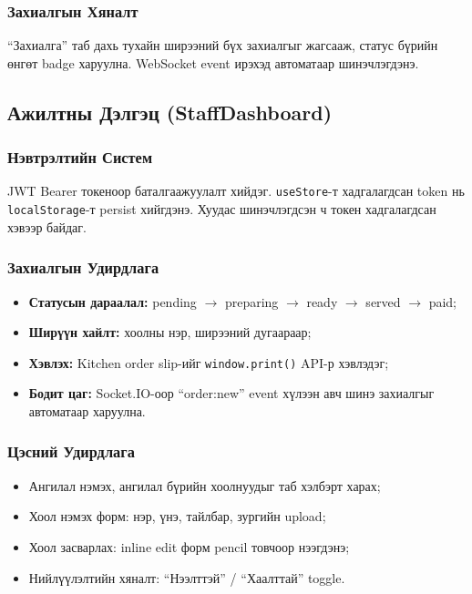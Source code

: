 \documentclass[12pt,a4paper]{article}
\begin{document}
\subsubsection{Захиалгын Хяналт}
``Захиалга'' таб дахь тухайн ширээний бүх захиалгыг жагсааж,
статус бүрийн өнгөт badge харуулна. WebSocket event ирэхэд
автоматаар шинэчлэгдэнэ.

\subsection{Ажилтны Дэлгэц (StaffDashboard)}

\subsubsection{Нэвтрэлтийн Систем}
JWT Bearer токеноор баталгаажуулалт хийдэг. \texttt{useStore}-т
хадгалагдсан token нь \texttt{localStorage}-т persist хийгдэнэ.
Хуудас шинэчлэгдсэн ч токен хадгалагдсан хэвээр байдаг.

\subsubsection{Захиалгын Удирдлага}
\begin{itemize}
  \item \textbf{Статусын дараалал:}
        pending $\to$ preparing $\to$ ready $\to$ served $\to$ paid;
  \item \textbf{Ширүүн хайлт:} хоолны нэр, ширээний дугаараар;
  \item \textbf{Хэвлэх:} Kitchen order slip-ийг
        \texttt{window.print()} API-р хэвлэдэг;
  \item \textbf{Бодит цаг:} Socket.IO-оор ``order:new'' event
        хүлээн авч шинэ захиалгыг автоматаар харуулна.
\end{itemize}

\subsubsection{Цэсний Удирдлага}
\begin{itemize}
  \item Ангилал нэмэх, ангилал бүрийн хоолнуудыг таб хэлбэрт харах;
  \item Хоол нэмэх форм: нэр, үнэ, тайлбар, зургийн upload;
  \item Хоол засварлах: inline edit форм pencil товчоор нээгдэнэ;
  \item Нийлүүлэлтийн хяналт: ``Нээлттэй'' / ``Хаалттай'' toggle.
\end{itemize}
\end{document}
